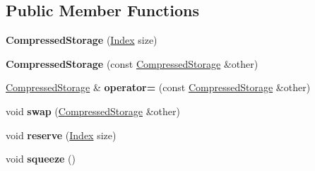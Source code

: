 \subsection*{Public Member Functions}
\begin{DoxyCompactItemize}
\item 
\mbox{\label{class_eigen_1_1internal_1_1_compressed_storage_a259255414bcca5b0f874422b814adcd8}} 
{\bfseries Compressed\+Storage} (\hyperlink{namespace_eigen_a62e77e0933482dafde8fe197d9a2cfde}{Index} size)
\item 
\mbox{\label{class_eigen_1_1internal_1_1_compressed_storage_a58e4d0458b53f8261fbb6547ae2c5cb7}} 
{\bfseries Compressed\+Storage} (const \hyperlink{class_eigen_1_1internal_1_1_compressed_storage}{Compressed\+Storage} \&other)
\item 
\mbox{\label{class_eigen_1_1internal_1_1_compressed_storage_a76413b8626d4ef2bd1681cbfb7d16dbd}} 
\hyperlink{class_eigen_1_1internal_1_1_compressed_storage}{Compressed\+Storage} \& {\bfseries operator=} (const \hyperlink{class_eigen_1_1internal_1_1_compressed_storage}{Compressed\+Storage} \&other)
\item 
\mbox{\label{class_eigen_1_1internal_1_1_compressed_storage_ab767a66ceffd14d21475675eb4f6fb23}} 
void {\bfseries swap} (\hyperlink{class_eigen_1_1internal_1_1_compressed_storage}{Compressed\+Storage} \&other)
\item 
\mbox{\label{class_eigen_1_1internal_1_1_compressed_storage_a1c32b23ec703d56e9087ae378f96c311}} 
void {\bfseries reserve} (\hyperlink{namespace_eigen_a62e77e0933482dafde8fe197d9a2cfde}{Index} size)
\item 
\mbox{\label{class_eigen_1_1internal_1_1_compressed_storage_aa8809423ddf2e140945668acecc32ad5}} 
void {\bfseries squeeze} ()
\item 
\mbox{\label{class_eigen_1_1internal_1_1_compressed_storage_ab303161d4a86c4b562b1d604025dafbd}} 

\end{DoxyCompactItemize}
